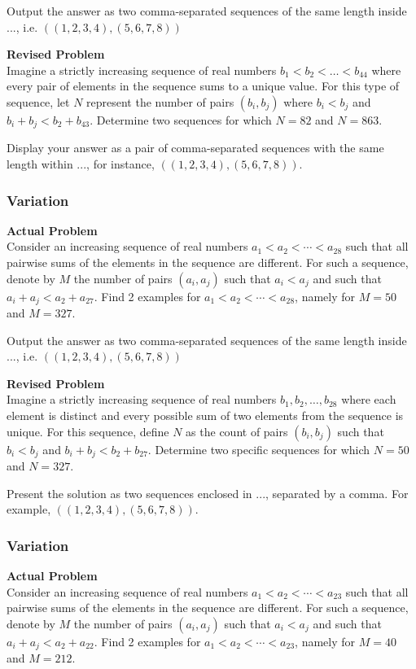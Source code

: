 Output the answer as two comma-separated sequences of the same length inside $\boxed{...}$, i.e. $\boxed{((1, 2, 3, 4), (5, 6, 7, 8))}$

\textbf{Revised Problem}\\
Imagine a strictly increasing sequence of real numbers \( b_1 < b_2 < \ldots < b_{44} \) where every pair of elements in the sequence sums to a unique value. For this type of sequence, let \( N \) represent the number of pairs \((b_i, b_j)\) where \( b_i < b_j \) and \( b_i+b_j < b_2+b_{43} \). Determine two sequences for which \( N=82 \) and \( N=863 \).

Display your answer as a pair of comma-separated sequences with the same length within \(\boxed{...}\), for instance, \(\boxed{((1, 2, 3, 4), (5, 6, 7, 8))}\).

\subsubsection{Variation}
\textbf{Actual Problem}\\
Consider an increasing sequence of real numbers $a_1 < a_2 < \cdots < a_{28}$ such that all pairwise sums of the elements in the sequence are different. For such a sequence, denote by $M$ the number of pairs $(a_i, a_j)$ such that $a_i < a_j$ and such that $a_i+a_j < a_2+a_{27}$. Find 2 examples for $a_1 < a_2 < \cdots < a_{28}$, namely for $M=50$ and $M=327$. 

Output the answer as two comma-separated sequences of the same length inside $\boxed{...}$, i.e. $\boxed{((1, 2, 3, 4), (5, 6, 7, 8))}$

\textbf{Revised Problem}\\
Imagine a strictly increasing sequence of real numbers \( b_1, b_2, \ldots, b_{28} \) where each element is distinct and every possible sum of two elements from the sequence is unique. For this sequence, define \( N \) as the count of pairs \((b_i, b_j)\) such that \( b_i < b_j \) and \( b_i + b_j < b_2 + b_{27} \). Determine two specific sequences for which \( N = 50 \) and \( N = 327 \).

Present the solution as two sequences enclosed in \(\boxed{...}\), separated by a comma. For example, \(\boxed{((1, 2, 3, 4), (5, 6, 7, 8))}\).

\subsubsection{Variation}
\textbf{Actual Problem}\\
Consider an increasing sequence of real numbers $a_1 < a_2 < \cdots < a_{23}$ such that all pairwise sums of the elements in the sequence are different. For such a sequence, denote by $M$ the number of pairs $(a_i, a_j)$ such that $a_i < a_j$ and such that $a_i+a_j < a_2+a_{22}$. Find 2 examples for $a_1 < a_2 < \cdots < a_{23}$, namely for $M=40$ and $M=212$. 

